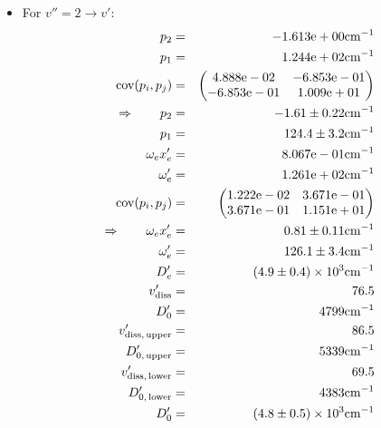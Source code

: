 \begin{itemize}
    \item For $v'' = 2 \rightarrow v'$:
        \begin{eqnarray}
            p_2 &=& -1.613\mathrm{e}+00 \mathrm{cm^{-1}} \nonumber \\
            p_1 &=& 1.244\mathrm{e}+02 \mathrm{cm^{-1}} \nonumber \\
            \mathrm{cov}(p_i, p_j) &=& 
            \begin{pmatrix}
                4.888\mathrm{e}-02 &-6.853\mathrm{e}-01 \\
                -6.853\mathrm{e}-01 &1.009\mathrm{e}+01 \\
            \end{pmatrix}
            \\ \Rightarrow \qquad
            p_2 &=& -1.61 \pm 0.22 \mathrm{cm^{-1}}\\
            p_1 &=& 124.4 \pm 3.2 \mathrm{cm^{-1}} \\
            \omega_e x_e' &=& 8.067\mathrm{e}-01 \mathrm{cm^{-1}} \nonumber \\
            \omega_e' &=& 1.261\mathrm{e}+02 \mathrm{cm^{-1}} \nonumber \\
            \mathrm{cov}(p_i, p_j) &=& 
            \begin{pmatrix}
                1.222\mathrm{e}-02 &3.671\mathrm{e}-01 \\
                3.671\mathrm{e}-01 &1.151\mathrm{e}+01 \\
            \end{pmatrix}
            \\ \Rightarrow \qquad
            \omega_e x_e' &=& 0.81 \pm 0.11 \mathrm{cm^{-1}}\\
            \omega_e' &=& 126.1 \pm 3.4 \mathrm{cm^{-1}} \\
            D_e' &=&\left(4.9 \pm 0.4\right) \times 10^{3} \mathrm{cm^{-1}} \\
            v_\mathrm{diss}' &=& 76.5 \\
            D_0' &=& 4799 \mathrm{cm^{-1}} \\
            v_\mathrm{diss,\, upper}' &=& 86.5 \\
            D_{0,\, \mathrm{upper}}' &=& 5339 \mathrm{cm^{-1}}\\
            v_\mathrm{diss,\, lower}' &=& 69.5 \\
            D_{0,\, \mathrm{lower}}' &=& 4383 \mathrm{cm^{-1}} \\
            D_0' &=& \left(4.8 \pm 0.5\right) \times 10^{3} \mathrm{cm^{-1}} 
        \end{eqnarray}
\end{itemize}
















